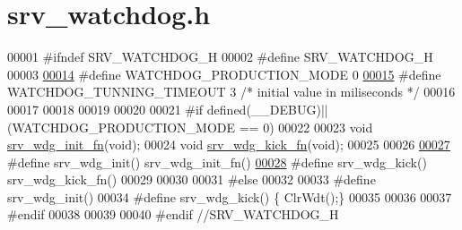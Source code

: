 \hypertarget{a00067_source}{\section{srv\+\_\+watchdog.\+h}
\label{a00067_source}
}

\begin{DoxyCode}
00001 \textcolor{preprocessor}{#ifndef SRV\_WATCHDOG\_H}
00002 \textcolor{preprocessor}{#define SRV\_WATCHDOG\_H}
00003 
\hypertarget{a00067_source_l00014}{}\hyperlink{a00067_afbfc46dbf4e78e184942fc2cbe77dbb3}{00014} \textcolor{preprocessor}{#define WATCHDOG\_PRODUCTION\_MODE     0}
\hypertarget{a00067_source_l00015}{}\hyperlink{a00067_aaf1a99e6db8062353e5f10d1f7d02938}{00015} \textcolor{preprocessor}{#define WATCHDOG\_TUNNING\_TIMEOUT     3 }\textcolor{comment}{/* initial value in miliseconds */}\textcolor{preprocessor}{}
00016 
00017 
00018 
00019 
00020 
00021 \textcolor{preprocessor}{#if defined(\_\_DEBUG)|| (WATCHDOG\_PRODUCTION\_MODE == 0)}
00022 
00023 \textcolor{keywordtype}{void} \hyperlink{a00067_a37c35718860234f09b8cef8680e1cc09}{srv\_wdg\_init\_fn}(\textcolor{keywordtype}{void});
00024 \textcolor{keywordtype}{void} \hyperlink{a00067_ac6f811346b702c404d5e6cdfb9262767}{srv\_wdg\_kick\_fn}(\textcolor{keywordtype}{void});
00025 
00026 
\hypertarget{a00067_source_l00027}{}\hyperlink{a00067_a8a83a885a73db05d7faa34734d132644}{00027} \textcolor{preprocessor}{#define srv\_wdg\_init()  srv\_wdg\_init\_fn()}
\hypertarget{a00067_source_l00028}{}\hyperlink{a00067_a710d148845397582739d170341f3d3d9}{00028} \textcolor{preprocessor}{#define srv\_wdg\_kick()  srv\_wdg\_kick\_fn()}
00029 
00030 
00031 \textcolor{preprocessor}{#else}
00032 
00033 \textcolor{preprocessor}{#define srv\_wdg\_init()  }
00034 \textcolor{preprocessor}{#define srv\_wdg\_kick()  \{ ClrWdt();\}}
00035 
00036 
00037 \textcolor{preprocessor}{#endif}
00038 
00039 
00040 \textcolor{preprocessor}{#endif //SRV\_WATCHDOG\_H}
\end{DoxyCode}
